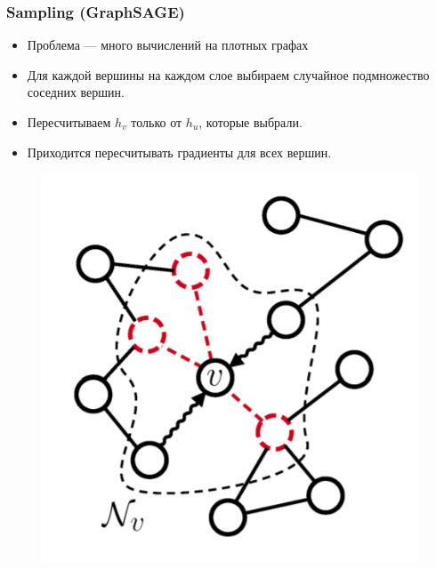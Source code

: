 \documentclass{beamer}
\begin{document}
\begin{frame}
\frametitle{Sampling (GraphSAGE)}
\begin{multicols}{2}
\begin{itemize}
	\item Проблема --- много вычислений на плотных графах
	\item Для каждой вершины на каждом слое выбираем случайное подмножество соседних вершин.
	\item Пересчитываем $h_v$ только от $h_u$, которые выбрали.
	\item Приходится пересчитывать градиенты для всех вершин.
\end{itemize}
\columnbreak
	\begin{figure}
		\includegraphics[width=\columnwidth]{sampling.png}
	\end{figure}
\end{multicols}
\end{frame}
\end{document}
